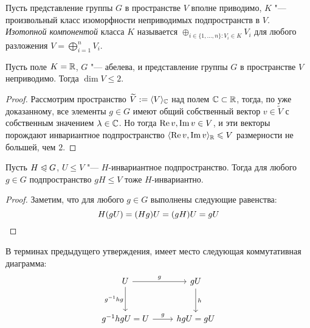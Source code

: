 \begin{definition}
	Пусть представление группы $G$ в пространстве $V$ вполне приводимо, $K$ "--- произвольный класс изоморфности неприводимых подпространств в $V$. \textit{Изотопной компонентой} класса $K$ называется $\oplus_{i \in \{1, \dotsc, n\} : V_i \in K}V_i$ для любого разложения $V = \bigoplus_{i = 1}^nV_i$.
\end{definition}

\begin{proposition}
	Пусть поле $K = \mathbb{R}$, $G$ "--- абелева, и представление группы $G$ в пространстве $V$ неприводимо. Тогда $\dim {V} \le 2$.
\end{proposition}

\begin{proof}
	Рассмотрим пространство $\widetilde V := \langle V\rangle_{\mathbb{C}}$ над полем $\mathbb{C} \subset \mathbb{R}$, тогда, по уже доказанному, все элементы $g \in G$ имеют общий собственный вектор $v \in \widetilde V$ с собственным значением $\lambda \in \mathbb{C}$. Но тогда $\operatorname{Re}{v}, \operatorname{Im}{v} \in V$, и эти векторы порождают инвариантное подпространство $\langle \operatorname{Re}{v}, \operatorname{Im}{v}\rangle_{\mathbb{R}} \leqslant V$ размерности не большей, чем $2$.
\end{proof}

\begin{proposition}
	Пусть $H \trianglelefteqslant G$, $U \le V$ "--- $H$-инвариантное подпространство. Тогда для любого $g \in G$ подпространство $gH \le V$ тоже $H$-инвариантно.
\end{proposition}

\begin{proof}
	Заметим, что для любого $g \in G$ выполнены следующие равенства:
	\[H(gU) = (Hg)U = (gH)U = gU\qedhere\]
\end{proof}

\begin{note}
	В терминах предыдущего утверждения, имеет место следующая коммутативная диаграмма:
	\[
	\begin{tikzcd}[row sep = large]
		U \arrow[swap]{d}{g^{-1}hg} \arrow{r}{g} & gU \arrow{d}{h}\\
		g^{-1}hgU = U \arrow{r}{g} & hgU = gU
	\end{tikzcd}
	\]
\end{note}
